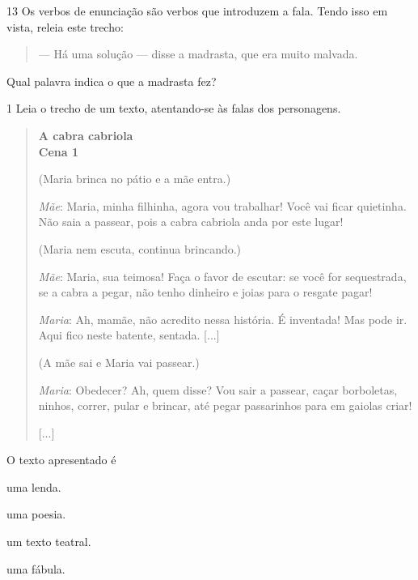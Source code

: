 \num{13} Os verbos de enunciação são verbos que introduzem a fala. Tendo isso em
vista, releia este trecho:

\begin{quote}
--- Há uma solução --- disse a madrasta, que era muito malvada.
\end{quote}


Qual palavra indica o que a madrasta fez?



\num{1} Leia o trecho de um texto, atentando-se às falas dos personagens.

\begin{quote}
\textbf{A cabra cabriola}\\
\textbf{Cena 1}

(Maria brinca no pátio e a mãe entra.)

\emph{Mãe}: Maria, minha filhinha, agora vou trabalhar! Você vai ficar
quietinha. Não saia a passear, pois a cabra cabriola anda por este
lugar!

(Maria nem escuta, continua brincando.)

\emph{Mãe}: Maria, sua teimosa! Faça o favor de escutar: se você for
sequestrada, se a cabra a pegar, não tenho dinheiro e joias para o
resgate pagar!

\emph{Maria}: Ah, mamãe, não acredito nessa história. É inventada! Mas
pode ir. Aqui fico neste batente, sentada. {[}...{]}

(A mãe sai e Maria vai passear.)

\emph{Maria}: Obedecer? Ah, quem disse? Vou sair a passear, caçar
borboletas, ninhos, correr, pular e brincar, até pegar passarinhos para
em gaiolas criar!

{[}...{]}

\end{quote}

O texto apresentado é

\begin{escolha}
\item uma lenda.

\item uma poesia.

\item um texto teatral.

\item uma fábula.
\end{escolha}



